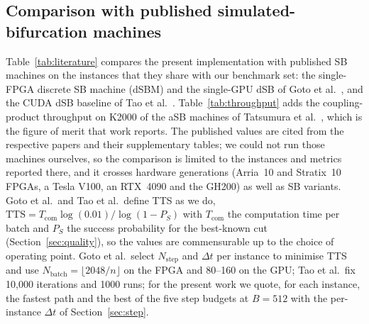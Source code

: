 \documentclass[11pt,a4paper]{article}
\begin{document}
\subsection{Comparison with published simulated-bifurcation machines}\label{sec:res-literature}
Table~\ref{tab:literature} compares the present implementation with published SB machines on the instances that they share with our benchmark set: the single-FPGA discrete SB machine (dSBM) and the single-GPU dSB of Goto et al.~\cite{goto2021}, and the CUDA dSB baseline of Tao et al.~\cite{tabu2026}. Table~\ref{tab:throughput} adds the coupling-product throughput on K2000 of the aSB machines of Tatsumura et al.~\cite{fpga2019}, which is the figure of merit that work reports. The published values are cited from the respective papers and their supplementary tables; we could not run those machines ourselves, so the comparison is limited to the instances and metrics reported there, and it crosses hardware generations (Arria~10 and Stratix~10 FPGAs, a Tesla V100, an RTX~4090 and the GH200) as well as SB variants. Goto et al.\ and Tao et al.\ define TTS as we do, $\mathrm{TTS}=T_{\mathrm{com}}\log(0.01)/\log(1-P_S)$ with $T_{\mathrm{com}}$ the computation time per batch and $P_S$ the success probability for the best-known cut (Section~\ref{sec:quality}), so the values are commensurable up to the choice of operating point. Goto et al.\ select $N_{\mathrm{step}}$ and $\Delta t$ per instance to minimise TTS and use $N_{\mathrm{batch}}=\lfloor 2048/n\rfloor$ on the FPGA and 80--160 on the GPU; Tao et al.\ fix 10,000 iterations and 1000 runs; for the present work we quote, for each instance, the fastest path and the best of the five step budgets at $B=512$ with the per-instance $\Delta t$ of Section~\ref{sec:step}.
\end{document}
